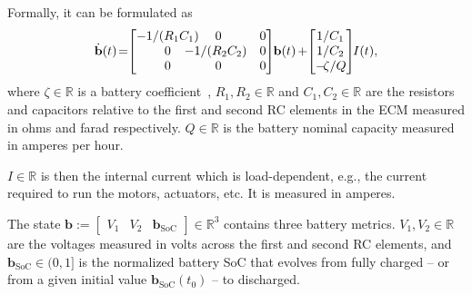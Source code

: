 \documentclass[letterpaper,10pt,conference,twoside]{IEEEtran}
\theoremstyle{definition}
\begin{document}
Formally, it can be formulated as~\cite{zhao2017observability}
\begin{equation}\label{eq:battmodel}
  \dot{\mathbf{b}}(t)\hspace*{-.4ex}=\hspace*{-.7ex}\begin{bmatrix}-1/(R_1C_1)\hspace*{-2ex}&\hspace*{-2ex}0&0\\\hspace*{2ex}0&\hspace*{-3ex}-1/(R_2C_2)&0\\\hspace*{2ex}0&\hspace*{-2ex}0&0\end{bmatrix}\hspace*{-.6ex}\mathbf{b}(t)\hspace*{-.2ex}+\hspace*{-.6ex}\begin{bmatrix}\hspace*{-.2ex}1/C_1\\\hspace*{-.2ex}1/C_2\\-\hspace*{-.4ex}\zeta/Q\end{bmatrix}\hspace*{-.7ex}I(t),
\end{equation}
where $\zeta\in\mathbb{R}$ is a battery coefficient~\cite{seewald2022energy}, $R_1,R_2\in\mathbb{R}$ and $C_1,C_2\in\mathbb{R}$ are the resistors and capacitors relative to the first and second RC elements in the ECM measured in ohms and farad respectively.
$Q\in\mathbb{R}$ is the battery nominal capacity measured in amperes per hour.

$I\in\mathbb{R}$ is then the internal current which is load-dependent, e.g., the current required to run the motors, actuators, etc. It is measured in amperes.

The state $\mathbf{b}:=\begin{bmatrix}V_1&V_2&\mathbf{b}_{\text{SoC}}\end{bmatrix}\in\mathbb{R}^3$ contains three battery metrics. $V_1,V_2\in\mathbb{R}$ are the voltages measured in volts across the first and second RC elements, and $\mathbf{b}_{\text{SoC}}\in(0,1]$ is the normalized battery SoC that evolves from fully charged -- or from a given initial value $\mathbf{b}_{\text{SoC}}(t_0)$ -- to discharged.
\end{document}
